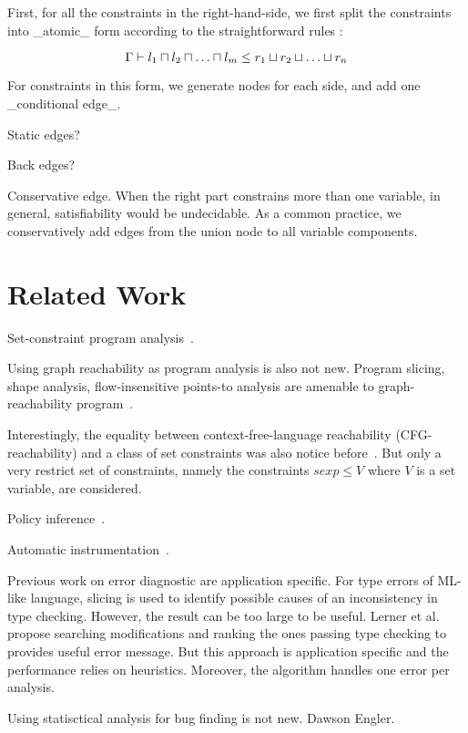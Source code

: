 First, for all the constraints in the right-hand-side, we
first split the constraints into _atomic_ form according to the
straightforward rules :

\[
\G \proves l_1 \meet l_2 \meet \dots \meet l_m \leq r_1 \join r_2 \join \dots
\join r_n
\]

For constraints in this form, we generate nodes for each side, and
add one _conditional edge_.

Static edges?

Back edges?

 Conservative edge. When the right part constrains more
than one variable, in general, satisfiability would be undecidable. As
a common practice, we conservatively add edges from the
union node to all variable components.

\section{Related Work}

Set-constraint program analysis~\cite{aiken-setconstraint}.

Using graph reachability as program analysis is also not
new. Program slicing, shape analysis, flow-insensitive points-to
analysis are amenable to graph-reachability program~\cite{reps-graph}.

Interestingly, the equality between context-free-language reachability
(CFG-reachability) and a class of set constraints was also notice
before~\cite{melski-cflgraph}. But only a very restrict set of
constraints, namely the constraints $sexp \leq V$ where $V$ is a
set variable, are considered.

Policy inference~\cite{chong:sp11, harris:ccs10}.

Automatic instrumentation~\cite{king:esop10}.

Previous work on error diagnostic are application specific. For type errors of
ML-like language, slicing is used to identify possible causes of an
inconsistency in type checking. However, the result can be too large to be
useful. Lerner et al.~\cite{lerner:pldi07} propose searching modifications and
ranking the ones passing type checking to provides useful error message. But
this approach is application specific and the performance relies on heuristics. Moreover, the algorithm handles one error per analysis.

Using statisctical
analysis for bug finding is not new. Dawson Engler.





